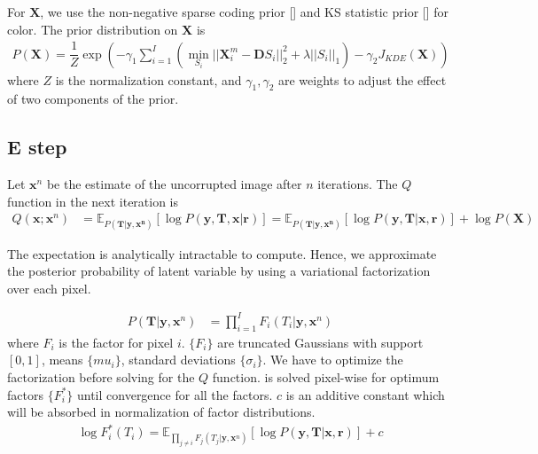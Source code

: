 For $\mathbf{X}$, we use the non-negative sparse coding prior [] and KS statistic prior [] for color. The prior distribution on $\mathbf{X}$ is
\begin{align}
P(\mathbf{X}) = \dfrac{1}{Z} \exp \left( - \gamma_1 \sum_{i=1}^{I} \left( \min_{S_i} || \mathbf{X}_i^m - \mathbf{D} S_i ||_2^2 + \lambda || S_i ||_1 \right) - \gamma_2 J_{KDE} \left( \mathbf{X} \right) \right)
\end{align}
where $Z$ is the normalization constant, and $\gamma_1, \gamma_2$ are weights to adjust the effect of two components of the prior.

\subsection{E step}
Let $\mathbf{x}^n$ be the estimate of the uncorrupted image after $n$ iterations. The $Q$ function in the next iteration is
\begin{align}
Q(\mathbf{x}; \mathbf{x}^n) &= \mathbb{E}_{P( \mathbf{T} | \mathbf{y}, \mathbf{x^n})} \left[ \log P \left( \mathbf{y}, \mathbf{T}, \mathbf{x} | \mathbf{r} \right) \right] = \mathbb{E}_{P( \mathbf{T} | \mathbf{y}, \mathbf{x^n})} \left[ \log P \left( \mathbf{y}, \mathbf{T} | \mathbf{x}, \mathbf{r} \right) \right] + \log P(\mathbf{X}) \label{eqn:Qvbem1} 
\end{align}

The expectation is analytically intractable to compute. Hence, we approximate the posterior probability of latent variable by using a variational factorization over each pixel.

\begin{align}
    P(\mathbf{T} | \mathbf{y}, \mathbf{x}^n) &= \prod_{i=1}^{I} F_i (T_i | \mathbf{y}, \mathbf{x}^n) \label{eqn:factvbem1}
\end{align}
where $F_i$ is the factor for pixel $i$. $\lbrace F_i \rbrace$ are truncated Gaussians with support $\left[0, 1 \right]$, means $\lbrace mu_i \rbrace$,  standard deviations $\lbrace \sigma_i \rbrace$. We have to optimize the factorization before solving for the $Q$ function.  is solved pixel-wise for optimum factors $ \lbrace F_i^* \rbrace $ until convergence for all the factors. $c$ is an additive constant which will be absorbed in normalization of factor distributions.
\begin{align}
    \log F_i^* (T_i) = \mathbb{E}_{ \prod_{j \neq i} F_j \left( T_j | \mathbf{y}, \mathbf{x}^n \right) } \left[ \log P \left( \mathbf{y}, \mathbf{T} | \mathbf{x}, \mathbf{r} \right) \right] + c \label{eqn:solvefactvbem1}
\end{align}

